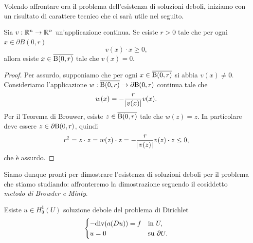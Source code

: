 Volendo affrontare ora il problema dell'esistenza di soluzioni deboli, iniziamo con un risultato di carattere tecnico che ci sarà utile nel seguito.
\begin{lemma}\label{tecnicopermetodidimonotonia}
	Sia $v: \R^n \to \R^n$ un'applicazione continua. Se esiste $r> 0$ tale che per ogni $x \in \partial B(0,r)$
	\[ v(x) \cdot x \ge 0, \]
	allora esiste $x \in \overline{\B(0,r)}$ tale che $v(x) = 0$.
\end{lemma}
\begin{proof}
	Per assurdo, supponiamo che per ogni $x \in \overline{\B(0,r)}$ si abbia $v(x) \ne 0$. Consideriamo l'applicazione $w: \overline{\B(0,r)} \to 	\partial \B(0,r)$ continua tale che 
	\[ w(x) = -\frac{r}{\abs{v(x)}}v(x). \]
	Per il Teorema di Brouwer, esiste $z \in \overline{\B(0,r)}$ tale che $w(z) = z$. In particolare deve essere $z \in \partial\B(0,r)$, quindi 
	\[ r^2 = z \cdot z = w(z) \cdot z =  -\frac{r}{\abs{v(z)}}v(z) \cdot z \le 0,\]
	che è assurdo.
\end{proof}
Siamo dunque pronti per dimostrare l'esistenza di soluzioni deboli per il problema che stiamo studiando: affronteremo la dimostrazione seguendo il cosiddetto  \emph{metodo di Browder e Minty}.
\begin{teorema}
	Esiste $u \in H^1_0(U)$ soluzione debole del problema di Dirichlet
	\[ 	\begin{cases}
		-\div(a(Du)) = f & \textup{in } U,\\
		u = 0 & \textup{su } \partial U.
	\end{cases} \]
\end{teorema}
